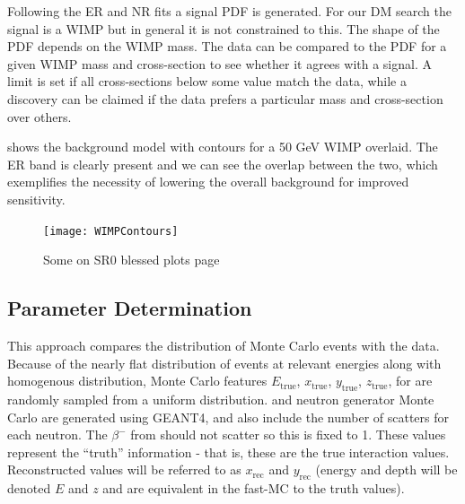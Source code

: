 Following the ER and NR fits a signal PDF is generated.  For our DM search the
signal is a WIMP but in general it is not constrained to this.  The shape of the PDF depends on the WIMP mass.  The data can be compared
to the PDF for a given WIMP mass and cross-section to see whether it agrees with a signal.  A limit is set if all cross-sections below
some value match the data, while a discovery can be claimed if the data prefers a particular mass and cross-section over others.

 shows the background model with contours for a 50 GeV WIMP overlaid.  The ER band is clearly
present and we can see the overlap between the two, which exemplifies the necessity of lowering the overall background for improved
sensitivity.

\begin{figure}
\centering
\texttt{[image: WIMPContours]}
\caption{Some on SR0 blessed plots page}
\label{fig:er_nr_calibrations_wimp_contours}
\end{figure}



\subsection{Parameter Determination}
\label{subsec:er_nr_calibrations_parameter_determ}
This approach compares the distribution of Monte Carlo events with the data.  Because of the nearly flat distribution of events at relevant
energies along with homogenous distribution, Monte Carlo features $E_{\mathrm{true}}$, $x_{\mathrm{true}}$, $y_{\mathrm{true}}$,
$z_{\mathrm{true}}$, for  are randomly sampled from a
uniform distribution.   and neutron generator Monte Carlo are generated using GEANT4, and also include the number of
scatters for each neutron.  The $\beta^-$ from  should not scatter so this is fixed to 1.  These values represent the ``truth''
information - that is, these are the true interaction values.  Reconstructed values will be referred to as $x_{\mathrm{rec}}$ and
$y_{\mathrm{rec}}$ (energy and depth will be denoted $E$ and $z$ and are equivalent in the fast-MC to the truth values).

